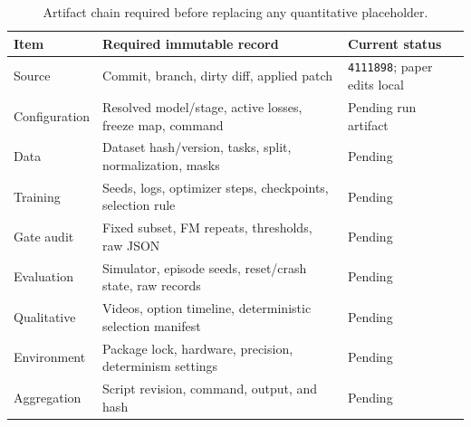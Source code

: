\begin{table}[t]
\centering
\scriptsize
\setlength{\tabcolsep}{4pt}
\begin{tabular}{p{}p{}p{}}
\toprule
Item & Required immutable record & Current status \\
\midrule
Source & Commit, branch, dirty diff, applied patch & \texttt{4111898}; paper edits local \\
Configuration & Resolved model/stage, active losses, freeze map, command & Pending run artifact \\
Data & Dataset hash/version, tasks, split, normalization, masks & Pending \\
Training & Seeds, logs, optimizer steps, checkpoints, selection rule & Pending \\
Gate audit & Fixed subset, FM repeats, thresholds, raw JSON & Pending \\
Evaluation & Simulator, episode seeds, reset/crash state, raw records & Pending \\
Qualitative & Videos, option timeline, deterministic selection manifest & Pending \\
Environment & Package lock, hardware, precision, determinism settings & Pending \\
Aggregation & Script revision, command, output, and hash & Pending \\
\bottomrule
\end{tabular}
\caption{Artifact chain required before replacing any quantitative placeholder.}
\label{tab:reproducibility}
\end{table}
